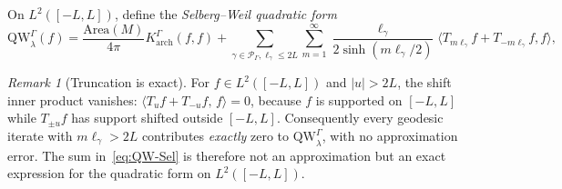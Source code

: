 \documentclass[12pt,a4paper]{article}
\theoremstyle{definition}
\theoremstyle{remark}
\newtheorem{remark}[theorem]{Remark}
\newcommand{\QW}{\mathrm{QW}}
\begin{document}
On $L^2([-L, L])$, define the \emph{Selberg--Weil quadratic form}
\begin{equation}
\label{eq:QW-Sel}
\QW^\Gamma_\lambda(f) = \frac{\mathrm{Area}(M)}{4\pi}K_\mathrm{arch}^\Gamma(f,f)
+ \sum_{\gamma \in \mathcal{P}_\Gamma, \ell_\gamma\le 2L}\sum_{m=1}^\infty
\frac{\ell_\gamma}{2\sinh(m\ell_\gamma/2)}\langle T_{m\ell_\gamma} f + T_{-m\ell_\gamma}f, f\rangle,
\end{equation}
\begin{remark}[Truncation is exact]
\label{rem:truncation-exact}
For $f \in L^2([-L,L])$ and $|u| > 2L$, the shift inner product vanishes:
$\langle T_u f + T_{-u}f,\, f\rangle = 0$, because $f$ is supported on $[-L,L]$
while $T_{\pm u}f$ has support shifted outside $[-L,L]$.  Consequently
every geodesic iterate with $m\ell_\gamma > 2L$ contributes \emph{exactly} zero
to $\QW^\Gamma_\lambda$, with no approximation error.  The sum in~\eqref{eq:QW-Sel} is therefore not an approximation but an exact expression
for the quadratic form on $L^2([-L,L])$.
\end{remark}
\end{document}
